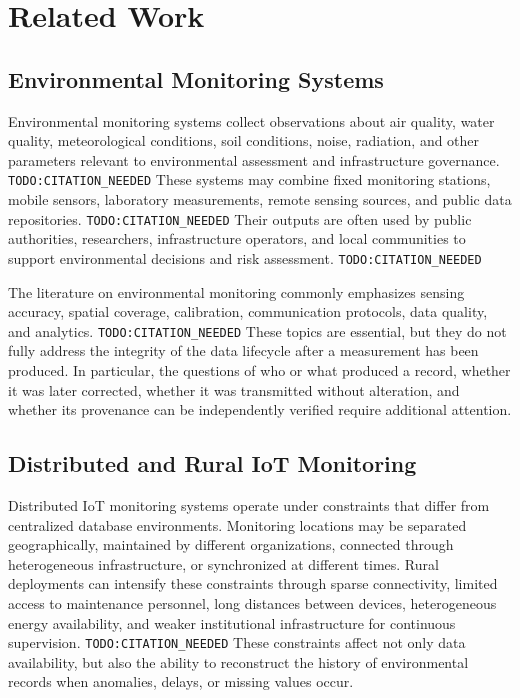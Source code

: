 \section{Related Work}

\subsection{Environmental Monitoring Systems}

Environmental monitoring systems collect observations about air quality, water quality, meteorological conditions, soil conditions, noise, radiation, and other parameters relevant to environmental assessment and infrastructure governance. \texttt{TODO:CITATION\_NEEDED} These systems may combine fixed monitoring stations, mobile sensors, laboratory measurements, remote sensing sources, and public data repositories. \texttt{TODO:CITATION\_NEEDED} Their outputs are often used by public authorities, researchers, infrastructure operators, and local communities to support environmental decisions and risk assessment. \texttt{TODO:CITATION\_NEEDED}

The literature on environmental monitoring commonly emphasizes sensing accuracy, spatial coverage, calibration, communication protocols, data quality, and analytics. \texttt{TODO:CITATION\_NEEDED} These topics are essential, but they do not fully address the integrity of the data lifecycle after a measurement has been produced. In particular, the questions of who or what produced a record, whether it was later corrected, whether it was transmitted without alteration, and whether its provenance can be independently verified require additional attention.

\subsection{Distributed and Rural IoT Monitoring}

Distributed IoT monitoring systems operate under constraints that differ from centralized database environments. Monitoring locations may be separated geographically, maintained by different organizations, connected through heterogeneous infrastructure, or synchronized at different times. Rural deployments can intensify these constraints through sparse connectivity, limited access to maintenance personnel, long distances between devices, heterogeneous energy availability, and weaker institutional infrastructure for continuous supervision. \texttt{TODO:CITATION\_NEEDED} These constraints affect not only data availability, but also the ability to reconstruct the history of environmental records when anomalies, delays, or missing values occur.

